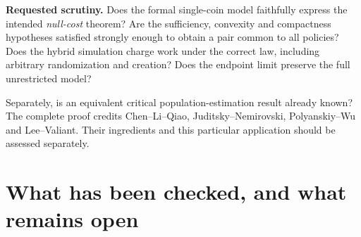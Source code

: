 \noindent\textbf{Requested scrutiny.} Does the formal single-coin model
faithfully express the intended \emph{null-cost} theorem? Are the
sufficiency, convexity and compactness hypotheses satisfied strongly enough
to obtain a pair common to all policies? Does the hybrid simulation charge
work under the correct law, including arbitrary randomization and creation?
Does the endpoint limit preserve the full unrestricted model?

Separately, is an equivalent critical population-estimation result already
known? The complete proof credits Chen--Li--Qiao, Juditsky--Nemirovski,
Polyanskiy--Wu and Lee--Valiant. Their ingredients and this particular
application should be assessed separately.

\clearpage
\begingroup\small
\section*{What has been checked, and what remains open}

